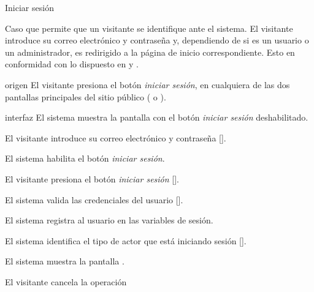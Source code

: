 %
%

{Iniciar sesión}
{
  Caso que permite que un visitante se identifique ante el sistema. El
  visitante introduce su correo electrónico y contraseña y, dependiendo de
  si es un usuario o un administrador, es redirigido a la página de
  inicio correspondiente. Esto en conformidad con lo dispuesto en
   y
  .

  \begin{trayectoriaPrincipal}

    \item[origen] El visitante presiona el botón \textit{iniciar sesión}, en
      cualquiera de las dos pantallas principales del sitio público
      ( o ).

    \item[interfaz] El sistema muestra la pantalla
       con el botón \textit{iniciar sesión}
      deshabilitado.

    \item El visitante introduce su correo electrónico y contraseña
      [].

    \item El sistema habilita el botón \textit{iniciar sesión}.

    \item El visitante presiona el botón \textit{iniciar sesión}
      [].

    \item El sistema valida las credenciales del usuario
      [].

    \item El sistema registra al usuario en las variables de sesión.

    \item El sistema identifica el tipo de actor que está iniciando
      sesión [].

    \item El sistema muestra la pantalla .

  \end{trayectoriaPrincipal}

  \begin{trayectoriaAlternativa}[ta:cancelar]
    {El visitante cancela la operación}


\end{trayectoriaAlternativa}}
